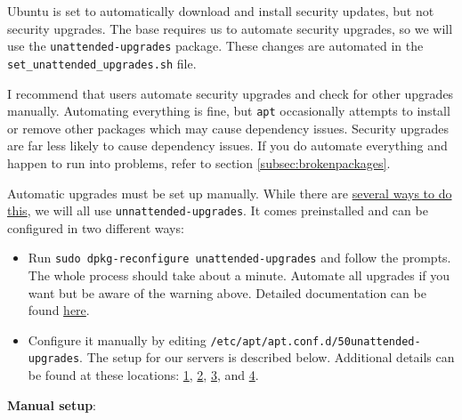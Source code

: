 Ubuntu is set to automatically download and install security updates, but not security upgrades. The base requires us to automate security upgrades, so we will use the \texttt{unattended-upgrades} package. These changes are automated in the \texttt{set\_unattended\_upgrades.sh} file.

I recommend that users automate security upgrades and check for other upgrades manually. Automating everything is fine, but \texttt{apt} occasionally attempts to install or remove other packages which may cause dependency issues. Security upgrades are far less likely to cause dependency issues. If you do automate everything and happen to run into problems, refer to section \ref{subsec:brokenpackages}.

Automatic upgrades must be set up manually. While there are \href{https://help.ubuntu.com/community/AutomaticSecurityUpdates}{several ways to do this}, we will all use \texttt{unnattended-upgrades}. It comes preinstalled and can be configured in two different ways:

\begin{itemize}
\item Run \texttt{sudo dpkg-reconfigure unattended-upgrades} and follow the prompts. The whole process should take about a minute. Automate all upgrades if you want but be aware of the warning above. Detailed documentation can be found \href{https://help.ubuntu.com/lts/serverguide/automatic-updates.html}{here}.

\item Configure it manually by editing \texttt{/etc/apt/apt.conf.d/50unattended-upgrades}. The setup for our servers is described below. Additional details can be found at these locations:
\href{https://libre-software.net/ubuntu-automatic-updates/}{1}, 
\href{https://www.howtoforge.com/tutorial/how-to-setup-automatic-security-updates-on-ubuntu-1604/}{2}, 
\href{https://linoxide.com/ubuntu-how-to/enable-disable-unattended-upgrades-ubuntu-16-04/}{3}, and 
\href{https://www.linuxbabe.com/ubuntu/automatic-security-update-unattended-upgrades-ubuntu-18-04}{4}. 
\end{itemize}

\textbf{Manual setup}:

